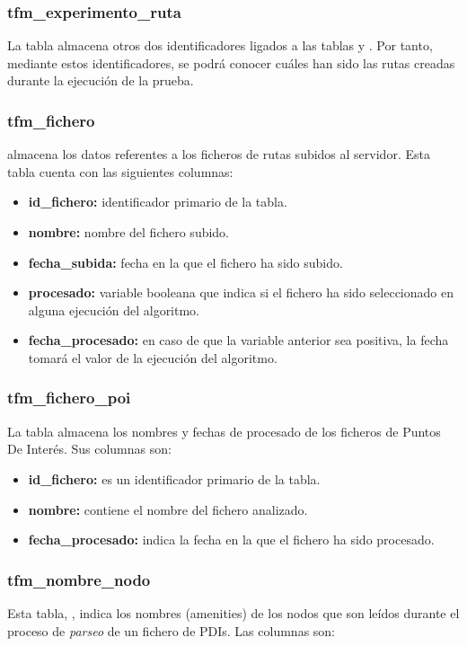 \subsubsection{tfm\_experimento\_ruta}
La tabla  almacena otros dos identificadores ligados a las tablas  y . Por tanto, mediante estos identificadores, se podrá conocer cuáles han sido las rutas creadas durante la ejecución de la prueba.

\subsubsection{tfm\_fichero}
 almacena los datos referentes a los ficheros de rutas subidos al servidor. Esta tabla cuenta con las siguientes columnas:

\begin{itemize}
	\item \textbf{id\_fichero:} identificador primario de la tabla.
	\item \textbf{nombre:} nombre del fichero subido.
	\item \textbf{fecha\_subida:} fecha en la que el fichero ha sido subido.
	\item \textbf{procesado:} variable booleana que indica si el fichero ha sido seleccionado en alguna ejecución del algoritmo.
	\item \textbf{fecha\_procesado:} en caso de que la variable anterior sea positiva, la fecha tomará el valor de la ejecución del algoritmo.
\end{itemize}

\subsubsection{tfm\_fichero\_poi}
La tabla  almacena los nombres y fechas de procesado de los ficheros de Puntos De Interés. Sus columnas son:

\begin{itemize}
	\item \textbf{id\_fichero:} es un identificador primario de la tabla.
	\item \textbf{nombre:} contiene el nombre del fichero analizado.
	\item \textbf{fecha\_procesado:} indica la fecha en la que el fichero ha sido procesado.
\end{itemize}

\subsubsection{tfm\_nombre\_nodo}
Esta tabla, , indica los nombres (amenities) de los nodos que son leídos durante el proceso de \textit{parseo} de un fichero de PDIs. Las columnas son:

